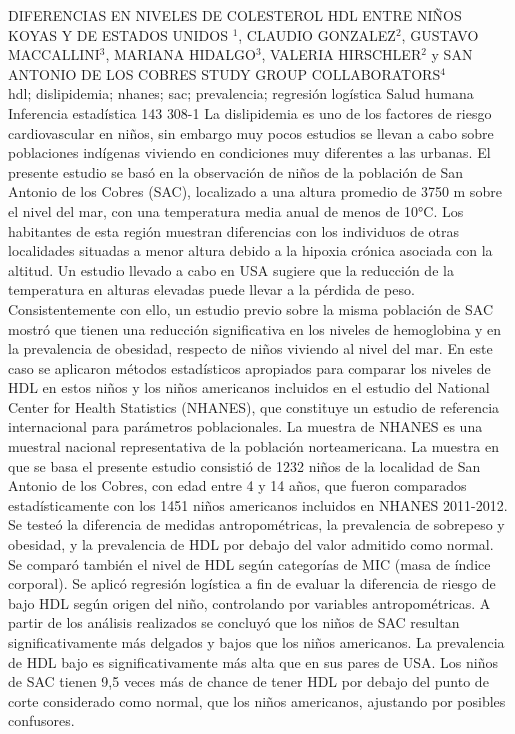 \A
{DIFERENCIAS EN NIVELES DE COLESTEROL HDL ENTRE NIÑOS KOYAS Y DE ESTADOS UNIDOS}
{$^1$, CLAUDIO GONZALEZ$^2$, GUSTAVO MACCALLINI$^3$, MARIANA HIDALGO$^3$, VALERIA HIRSCHLER$^2$ y SAN ANTONIO DE LOS COBRES STUDY GROUP COLLABORATORS$^4$}
{
\\}
{hdl; dislipidemia; nhanes; sac; prevalencia; regresión logística} 
 {Salud humana} 
 {Inferencia estadística} 
 {143} 
 {308-1}
{La dislipidemia es uno de los factores de riesgo cardiovascular en niños, sin embargo muy pocos estudios se llevan a cabo sobre poblaciones indígenas viviendo en condiciones muy diferentes a las urbanas. El presente estudio se basó en la observación de niños de la población de San Antonio de los Cobres (SAC), localizado a una altura promedio de 3750 m sobre el nivel del mar, con una temperatura media anual de menos de 10°C. Los habitantes de esta región muestran diferencias con los individuos de otras localidades situadas a menor altura debido a la hipoxia crónica asociada con la altitud. Un estudio llevado a cabo en USA sugiere que la reducción de la temperatura en alturas elevadas puede llevar a la pérdida de peso. Consistentemente con ello, un estudio previo sobre la misma población de SAC mostró que tienen una reducción significativa en los niveles de hemoglobina y en la prevalencia de obesidad, respecto de niños viviendo al nivel del mar. En este caso se aplicaron métodos estadísticos apropiados para comparar los niveles de HDL en estos niños y los niños americanos incluidos en el estudio del National Center for Health Statistics (NHANES), que constituye un estudio de referencia internacional para parámetros poblacionales. La muestra de NHANES es una muestral nacional representativa de la población norteamericana. La muestra en que se basa el presente estudio consistió de 1232 niños de la localidad de San Antonio de los Cobres, con edad entre 4 y 14 años, que fueron comparados estadísticamente con los 1451 niños americanos incluidos en NHANES 2011-2012. Se testeó la diferencia de medidas antropométricas, la prevalencia de sobrepeso y obesidad, y la prevalencia de HDL por debajo del valor admitido como normal. Se comparó también el nivel de HDL según categorías de MIC (masa de índice corporal). Se aplicó regresión logística a fin de evaluar la diferencia de riesgo de bajo HDL según origen del niño, controlando por variables antropométricas. A partir de los análisis realizados se concluyó que los niños de SAC resultan significativamente más delgados y bajos que los niños americanos. La prevalencia de HDL bajo es significativamente más alta que en sus pares de USA. Los niños de SAC tienen 9,5 veces más de chance de tener HDL por debajo del punto de corte considerado como normal, que los niños americanos, ajustando por posibles confusores.}
